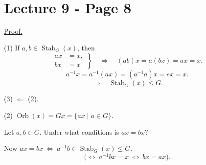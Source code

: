 
\section*{Lecture 9 - Page 8}

\noindent\underline{Proof.}

\bigskip
\noindent (1) If $a,b\in\operatorname{Stab}_G(x)$, then
\[
\left.\begin{aligned}
 ax&=x,\\
 bx&=x
\end{aligned}\right\}
\quad\Longrightarrow\quad (ab)x=a(bx)=ax=x.
\]
\[
a^{-1}x=a^{-1}(ax)=(a^{-1}a)x=ex=x.
\]
\[
\Longrightarrow\quad \operatorname{Stab}_G(x)\leq G.
\]

\bigskip
\noindent (3) $\Longleftarrow$ (2).

\bigskip
\noindent (2) $\operatorname{Orb}(x)=Gx=\{ax\mid a\in G\}$.

\bigskip
\noindent Let $a,b\in G$. Under what conditions is $ax=bx$?

\bigskip
\noindent Now $ax=bx\ \Longleftrightarrow\ a^{-1}b\in\operatorname{Stab}_G(x)\leq G$.
\[
\big(\Longleftrightarrow\ a^{-1}bx=x\ \Longleftrightarrow\ bx=ax\big).
\]
